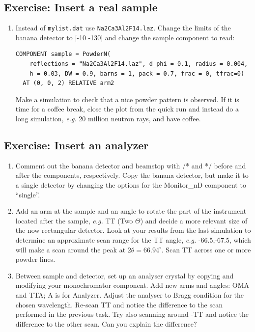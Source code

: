 \subsection{Exercise: Insert a real sample}
\begin{enumerate}
\item{Instead of \texttt{mylist.dat} use \texttt{Na2Ca3Al2F14.laz}. Change the limits of the banana detector to [-10 -130] and change the sample component to read:
\begin{verbatim}
COMPONENT sample = PowderN(
    reflections = "Na2Ca3Al2F14.laz", d_phi = 0.1, radius = 0.004,
    h = 0.03, DW = 0.9, barns = 1, pack = 0.7, frac = 0, tfrac=0)
  AT (0, 0, 2) RELATIVE arm2
\end{verbatim}

Make a simulation to check that a nice powder pattern is observed. If it is time for a coffee break, close the plot from the quick run and instead do a long simulation, \emph{e.g.} 20 million neutron rays, and have coffee.}
\end{enumerate}
\subsection{Exercise: Insert an analyzer}
\begin{enumerate}
\item{Comment out the banana detector and beamstop with /* and */ before and after the components, respectively. Copy the banana detector, but make it to a single detector by changing the options for the Monitor\_nD component to ``single''.}

\item{Add an arm at the sample and an angle to rotate the part of the instrument located after the sample, \emph{e.g.} TT (Two $\Theta$) and decide a more relevant size of the now rectangular detector. Look at your results from the last simulation to determine an approximate scan range for the TT angle, \emph{e.g.} -66.5,-67.5, which will make a scan around the peak at $2\theta=66.94^{\circ}$. Scan TT across one or more powder lines.}

\item{Between sample and detector, set up an analyser crystal by copying and modifying your monochromator component. Add new arms and angles: OMA and TTA; A is for Analyzer. Adjust the analyser to Bragg condition for the chosen wavelength. Re-scan TT and notice the difference to the scan performed in the previous task. Try also scanning around -TT and notice the difference to the other scan. Can you explain the difference?}
\end{enumerate}
